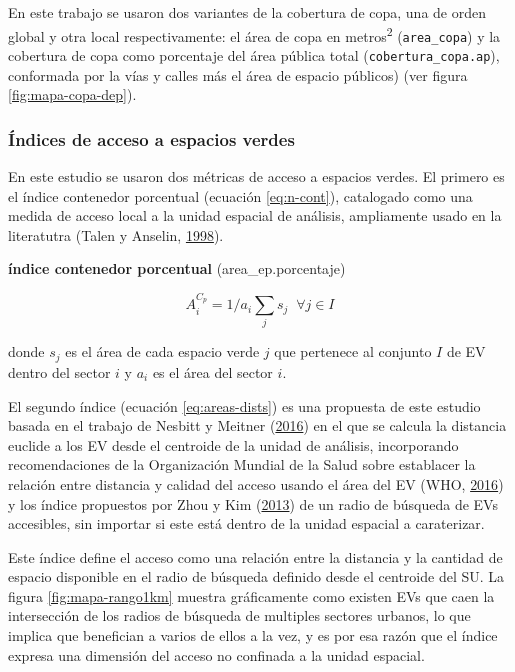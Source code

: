 \documentclass[12pt,a4paper,openany]{book}
\theoremstyle{definition}
\theoremstyle{definition}
\theoremstyle{definition}
\theoremstyle{remark}
\begin{document}
En este trabajo se usaron dos variantes de la cobertura de copa, una de
orden global y otra local respectivamente: el área de copa en
metros\textsuperscript{2} (\texttt{area\_copa}) y la cobertura de copa
como porcentaje del área pública total (\texttt{cobertura\_copa.ap}),
conformada por la vías y calles más el área de espacio públicos) (ver
figura \ref{fig:mapa-copa-dep}).

\subsubsection{Índices de acceso a espacios
verdes}\label{uxedndices-de-acceso-a-espacios-verdes}

En este estudio se usaron dos métricas de acceso a espacios verdes. El
primero es el índice contenedor porcentual (ecuación \eqref{eq:n-cont}),
catalogado como una medida de acceso local a la unidad espacial de
análisis, ampliamente usado en la literatutra (Talen y Anselin,
\protect\hyperlink{ref-talen_assessing_1998}{1998}).

\textbf{índice contenedor porcentual} (area\_ep.porcentaje)

\begin{equation}
A^{C_p}_i =1/a_i\sum_j{s_j} \;  \; \forall  j \in I
\label{eq:n-cont}
\end{equation}

donde \(s_j\) es el área de cada espacio verde \(j\) que pertenece al
conjunto \(I\) de EV dentro del sector \(i\) y \(a_i\) es el área del
sector \(i\).

El segundo índice (ecuación \eqref{eq:areas-dists}) es una propuesta de
este estudio basada en el trabajo de Nesbitt y Meitner
(\protect\hyperlink{ref-nesbitt_exploring_2016}{2016}) en el que se
calcula la distancia euclide a los EV desde el centroide de la unidad de
análisis, incorporando recomendaciones de la Organización Mundial de la
Salud sobre establacer la relación entre distancia y calidad del acceso
usando el área del EV (WHO, \protect\hyperlink{ref-who2016urban}{2016})
y los índice propuestos por Zhou y Kim
(\protect\hyperlink{ref-zhou_social_2013}{2013}) de un radio de búsqueda
de EVs accesibles, sin importar si este está dentro de la unidad
espacial a caraterizar.

Este índice define el acceso como una relación entre la distancia y la
cantidad de espacio disponible en el radio de búsqueda definido desde el
centroide del SU. La figura \ref{fig:mapa-rango1km} muestra gráficamente
como existen EVs que caen la intersección de los radios de búsqueda de
multiples sectores urbanos, lo que implica que benefician a varios de
ellos a la vez, y es por esa razón que el índice expresa una dimensión
del acceso no confinada a la unidad espacial.
\end{document}

